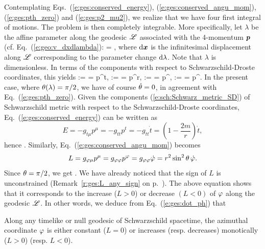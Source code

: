 Contemplating Eqs.~(\ref{e:ges:conserved_energy}), (\ref{e:ges:conserved_angu_mom}),
(\ref{e:ges:pth_zero}) and (\ref{e:ges:p2_mu2}), we realize that we have
four first integral of motions. The problem is then completely integrable.
More specifically, let $\lambda$ be the affine parameter along the geodesic
$\mathscr{L}$ associated with the 4-momentum $\bm{p}$ (cf. Eq.~(\ref{e:geo:v_dxdlambda}):
\be \label{e:ges:def_lambda}
     =  ,
\ee
where  $\mathrm{d}\bm{x}$ is the infinitesimal displacement along $\mathscr{L}$ corresponding
to the parameter change $\mathrm{d}\lambda$. Note that $\lambda$ is dimensionless.
In terms of the components with respect to Schwarzschild-Droste coordinates,
this yields
\be \label{e:ges:comp_4_momentum}
     :=  = p^t,\qquad
     :=  = p^r,\qquad
    \dot{\th} := \frac{\D \th}{\D\lambda} = p^\th,\qquad
    \dot{\ph} := \frac{\D \ph}{\D\lambda} = p^\ph .
\ee
In the present case, where $\theta(\lambda)=\pi/2$, we have of course $\dot{\theta}=0$,
in agreement with Eq.~(\ref{e:ges:pth_zero}).
Given the components (\ref{e:sch:Schwarz_metric_SD}) of Schwarzschild metric
with respect to the Schwarzschild-Droste coordinates,
Eq.~(\ref{e:ges:conserved_energy}) can be written as
\[
    E = - g_{t\mu} p^\mu = - g_{tt} p^t = - g_{tt} \dot{t}
    = \left(1 - \frac{2m}{r} \right) \dot{t} ,
\]
hence
\be \label{e:ges:dot_t}
    .
\ee
Similarly, Eq.~(\ref{e:ges:conserved_angu_mom}) becomes
\[
    L = g_{\varphi\mu} p^\mu = g_{\varphi\varphi} p^\varphi  = g_{\varphi\varphi} \dot{\varphi}
        = r^2 \sin^2\theta \, \dot{\varphi} .
\]
Since $\theta=\pi/2$, we get
\be \label{e:ges:dot_ph}
     .
\ee
We have already noticed that the sign of $L$ is unconstrained (Remark~\ref{r:ges:L_any_sign} on p.~\pageref{r:ges:L_any_sign}). The above equation
shows that it corresponds to the increase ($L>0$) or decrease $(L<0)$
of $\varphi$ along the geodesic $\mathscr{L}$. In other words, we deduce from Eq.~(\ref{e:ges:dot_ph})
that
\begin{greybox}
Along any timelike or null geodesic of Schwarzschild spacetime,
the azimuthal coordinate $\varphi$ is either constant ($L=0$)
or increases (resp. decreases) monotically ($L>0$) (resp. $L<0$).
\end{greybox}

